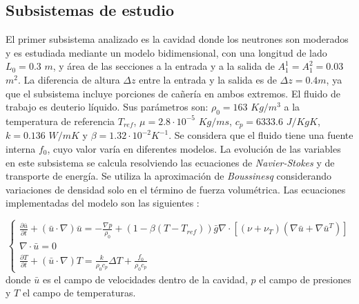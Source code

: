 \subsection*{Subsistemas de estudio}
El primer subsistema analizado es la cavidad donde los neutrones son moderados y es estudiada mediante un modelo bidimensional,
con una longitud de lado $L_0=0.3$ $m$, y área de las secciones a la entrada y a la salida de $A_1^1=A_1^2=0.03$ $m^2$.
La diferencia de altura $\Delta z$ entre la entrada y la salida es de $\Delta z=0.4m$,
ya que el subsistema incluye porciones de cañería en ambos extremos.
El fluido de trabajo es deuterio líquido.
Sus parámetros son:
$\rho_0=163$ $Kg/m^3$ a la temperatura de referencia $T_{ref}$,
$\mu=2.8\cdot 10^{-5}$ $Kg/ms$, $c_p=6333.6$ $J/KgK$, 
$k=0.136$ $W/mK$ y $\beta=1.32\cdot10^{-2}K^{-1}$.
Se considera que el fluido tiene una fuente interna $f_0$, cuyo valor varía en diferentes modelos.
La evolución de las variables en este subsistema se calcula resolviendo las ecuaciones de \textit{Navier-Stokes}
y de transporte de energía.
Se utiliza la aproximación de \textit{Boussinesq} considerando variaciones de densidad solo en el término de fuerza volumétrica.
Las ecuaciones implementadas del modelo son las siguientes \cite{gunzburger} \cite{kays}:

\begin{equation}
\left\{ \begin{array}{lr}
\displaystyle \frac {\partial \bar{u}}{\partial t} + ( \bar{u} \cdot \nabla) \bar{u} = - \frac {\nabla p}{\rho_0}
+ \left( 1- \beta (T-T_{ref}) \right)\bar{g} \nabla \cdot \left[ \left( \nu + \nu_T \right) \left( \nabla \bar{u} + \nabla \bar{u}^T \right) \right] \\ [0.2cm]
\nabla \cdot \bar{u} = 0 \\ [0.2cm]
\displaystyle \frac {\partial T}{\partial t} + ( \bar{u} \cdot \nabla) T = \frac {k}{\rho_0 c_p} \Delta T + \frac{f_0}{\rho_0 c_p}
\label{eq-cavidad}
\end{array}
\right.
\end{equation}
donde $\bar{u}$ es el campo de velocidades dentro de la cavidad,
$p$ el campo de presiones y
$T$ el campo de temperaturas.

